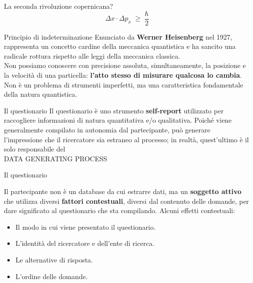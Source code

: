 \documentclass{beamer}
\begin{document}
\begin{frame}{La seconda rivoluzione copernicana?}
    \[
      \Delta x \cdot \Delta p_x \;\ge\; \frac{\hbar}{2}
    \]
\begin{block}{Principio di indeterminazione}
\small
    Enunciato da \textbf{Werner Heisenberg} nel 1927, rappresenta un concetto cardine della meccanica quantistica e ha sancito una radicale rottura rispetto alle leggi della meccanica classica. \\
    \smallskip
    Non possiamo conoscere con precisione assoluta, simultaneamente, la posizione e la velocità di una particella: \textbf{l’atto stesso di misurare qualcosa lo cambia}. Non è un problema di strumenti imperfetti, ma una caratteristica fondamentale della natura quantistica.
\end{block}
\end{frame}

\begin{frame}{Il questionario}
    Il questionario è uno strumento \textbf{self-report} utilizzato per raccogliere informazioni di natura quantitativa e/o qualitativa. Poiché viene generalmente compilato in autonomia dal partecipante, può generare l'impressione che il ricercatore sia estraneo al processo; in realtà, quest'ultimo è il solo responsabile del \\
    \vspace{1em}
    \pause
    \huge\centering
    \alert{DATA GENERATING PROCESS}
\end{frame}

\begin{frame}{Il questionario}
\begin{block}{Il partecipante}
    non è un database da cui estrarre dati, ma un \textbf{soggetto attivo} che utilizza diversi \textbf{fattori contestuali}, diversi dal contenuto delle domande, per dare significato al questionario che sta compilando. Alcuni effetti contestuali: \\
    \begin{itemize}
        \item Il modo in cui viene presentato il questionario.
        \item L’identità del ricercatore e dell’ente di ricerca.
        \item Le alternative di risposta.
        \item L'ordine delle domande.
    \end{itemize}
\end{block}
\end{frame}
\end{document}

